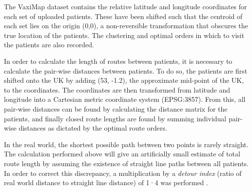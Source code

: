 \documentclass{article}
\def\vm{VaxiMap}
\begin{document}
The \vm{} dataset contains the relative latitude and longitude coordinates for each set of uploaded patients. These have been shifted such that the centroid of each set lies on the origin (0,0), a non-reversible transformation that obscures the true location of the patients. The clustering and optimal orders in which to visit the patients are also recorded. 

In order to calculate the length of routes between patients, it is necessary to calculate the pair-wise distances between patients. To do so, the patients are first shifted onto the UK by adding (53, -1.2), the approximate mid-point of the UK, to the coordinates. The coordinates are then transformed from latitude and longitude into a Cartesian metric coordinate system (EPSG:3857). From this, all pair-wise distances can be found by calculating the distance matrix for the patients, and finally closed route lengths are found by summing individual pair-wise distances as dictated by the optimal route orders. 

In the real world, the shortest possible path between two points is rarely straight. The calculation performed above will give an artificially small estimate of total route length by assuming the existence of straight line paths between all patients. In order to correct this discrepancy, a multiplication by a \textit{detour index} (ratio of real world distance to straight line distance) of 1·4 was performed \cite{Cole1968}. 



\end{document}
